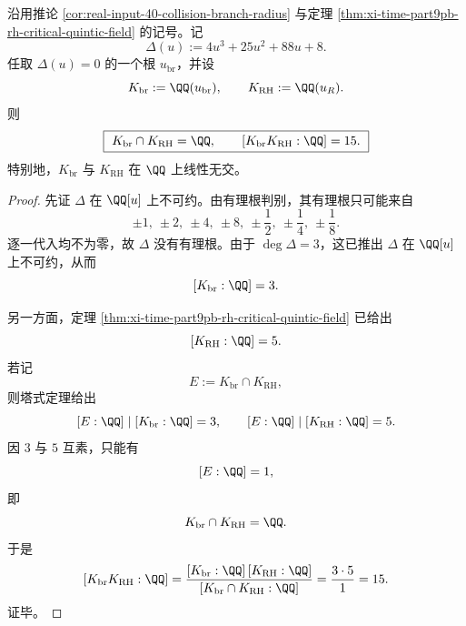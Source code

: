 \begin{theorem}[临界五次域与分歧三次域线性无交]\label{thm:xi-time-part9pb-rh-branch-cubic-linear-disjoint}
沿用推论 \ref{cor:real-input-40-collision-branch-radius} 与定理
\ref{thm:xi-time-part9pb-rh-critical-quintic-field} 的记号。记
\[
\Delta(u):=4u^3+25u^2+88u+8.
\]
任取 \(\Delta(u)=0\) 的一个根 \(u_{\mathrm{br}}\)，并设
\[
K_{\mathrm{br}}:=\QQ(u_{\mathrm{br}}),
\qquad
K_{\mathrm{RH}}:=\QQ(u_R).
\]
则
\[
\boxed{\ K_{\mathrm{br}}\cap K_{\mathrm{RH}}=\QQ,\qquad
[K_{\mathrm{br}}K_{\mathrm{RH}}:\QQ]=15.\ }
\]
特别地，\(K_{\mathrm{br}}\) 与 \(K_{\mathrm{RH}}\) 在 \(\QQ\) 上线性无交。
\end{theorem}
\begin{proof}
先证 \(\Delta\) 在 \(\QQ[u]\) 上不可约。由有理根判别，其有理根只可能来自
\[
\pm 1,\ \pm 2,\ \pm 4,\ \pm 8,\ \pm \frac12,\ \pm \frac14,\ \pm \frac18.
\]
逐一代入均不为零，故 \(\Delta\) 没有有理根。由于 \(\deg \Delta=3\)，这已推出 \(\Delta\) 在 \(\QQ[u]\) 上不可约，从而
\[
[K_{\mathrm{br}}:\QQ]=3.
\]

另一方面，定理 \ref{thm:xi-time-part9pb-rh-critical-quintic-field} 已给出
\[
[K_{\mathrm{RH}}:\QQ]=5.
\]
若记
\[
E:=K_{\mathrm{br}}\cap K_{\mathrm{RH}},
\]
则塔式定理给出
\[
[E:\QQ]\mid [K_{\mathrm{br}}:\QQ]=3,
\qquad
[E:\QQ]\mid [K_{\mathrm{RH}}:\QQ]=5.
\]
因 \(3\) 与 \(5\) 互素，只能有
\[
[E:\QQ]=1,
\]
即
\[
K_{\mathrm{br}}\cap K_{\mathrm{RH}}=\QQ.
\]
于是
\[
[K_{\mathrm{br}}K_{\mathrm{RH}}:\QQ]
=
\frac{[K_{\mathrm{br}}:\QQ]\,[K_{\mathrm{RH}}:\QQ]}
{[K_{\mathrm{br}}\cap K_{\mathrm{RH}}:\QQ]}
=
\frac{3\cdot 5}{1}
=
15.
\]
证毕。
\end{proof}

